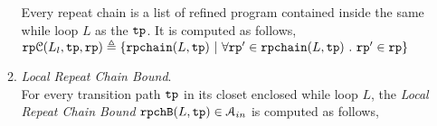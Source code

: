 \begin{enumerate}
\begin{enumerate}
\begin{defn}
\end{defn}
%
%
%
\begin{defn}
  \label{def:repeatchainset}
 Every repeat chain is a list of refined program contained inside the same while loop $L$ as the $\mathtt{tp}$. It is computed as follows,
\\
 $\mathtt{rp}\mathcal{C}(L_l, \mathtt{tp}, \mathtt{rp}) \triangleq 
 \{\mathtt{rpchain}(L, \mathtt{tp}) ~|~  
 \forall \mathtt{rp}' \in \mathtt{rpchain}(L, \mathtt{tp}) ~.~ \mathtt{rp}' \in \mathtt{rp} \}$
\end{defn}
\item  \emph{Local Repeat Chain Bound}.
\\
For every transition path $\mathtt{tp}$
in its closet enclosed while loop $L$,
the \emph{Local Repeat Chain Bound} $\mathtt{rpchB}(L, \mathtt{tp}) \in \mathcal{A}_{in}$ is computed as follows,

\end{enumerate}
\end{enumerate}
